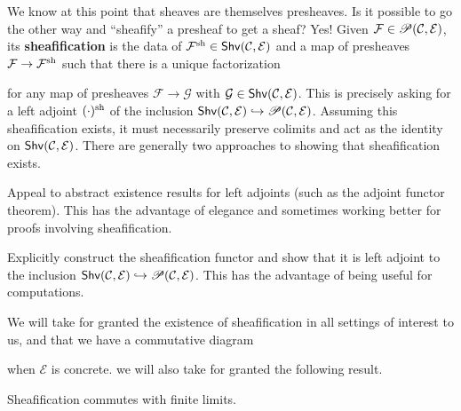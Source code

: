 \documentclass[11pt]{article}
\newcommand{\CC}{\mathcal{C}}
\renewcommand{\F}{\mathcal{F}}
\newcommand{\EE}{\mathcal{E}}
\newcommand{\G}{\mathcal{G}}
\begin{document}
We know at this point that sheaves are themselves presheaves. Is it possible to go the other way and ``sheafify'' a presheaf to get a sheaf? Yes! Given $\F\in\Pre(\CC,\EE)$, its \textbf{sheafification} is the data of $\F^{\sh}\in\Shv(\CC,\EE)$ and a map of presheaves $\F\to\F^{\sh}$ such that there is a unique factorization
\begin{center}
\end{center}
for any map of presheaves $\F\to\G$ with $\G\in\Shv(\CC,\EE)$. This is precisely asking for a left adjoint $(\cdot)^{\operatorname{sh}}$ of the inclusion $\Shv(\CC,\EE)\inj\Pre(\CC,\EE)$. Assuming this sheafification exists, it must necessarily preserve colimits and act as the identity on $\Shv(\CC,\EE)$. There are generally two approaches to showing that sheafification exists.
\begin{enum}{\arabic}
\item Appeal to abstract existence results for left adjoints (such as the adjoint functor theorem). This has the advantage of elegance and sometimes working better for proofs involving sheafification.

\item Explicitly construct the sheafification functor and show that it is left adjoint to the inclusion $\Shv(\CC,\EE)\inj\Pre(\CC,\EE)$. This has the advantage of being useful for computations.
\end{enum}
We will take for granted the existence of sheafification in all settings of interest to us, and that we have a commutative diagram
\begin{center}
\end{center}
when $\EE$ is concrete. we will also take for granted the following result.

\begin{proposition}
Sheafification commutes with finite limits.
\end{proposition}
\end{document}
